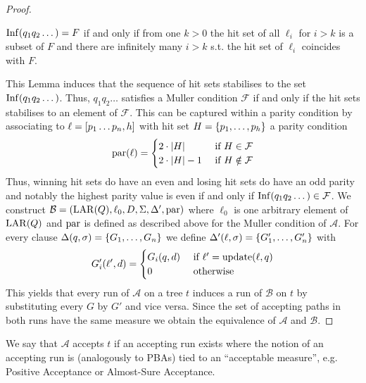 \begin{proof}
  \begin{lemma}
    \cite[Lemma 2.1]{SimAltTreeAuto}
    $\operatorname{Inf}(q_{1}q_{2}\dots) = F$ if and only if from one $k>0$ the hit set of
    all $\ell_{i}$ for $i>k$ is a subset of $F$ and there are infinitely many
    $i>k$ s.t. the hit set of $\ell_{i}$ coincides with $F$.
  \end{lemma}
  This Lemma induces that the sequence of hit sets stabilises to the set
  $\operatorname{Inf}(q_{1}q_{2}\dots)$. Thus, $q_{1}q_{2}\dots$ satisfies a Muller condition
  $\mathcal{F}$ if and only if the hit sets stabilises to an element of
  $\mathcal{F}$. This can be captured within a parity condition by associating
  to $\ell = \left[p_{1}\dots p_{n},h\right]$ with hit set
  $H = \left\{p_{1},\dots,p_{h}\right\}$ a parity condition
  \begin{equation*}
    \operatorname{par}(\ell) = \begin{cases}
      2\cdot\left\vert{H}\right\vert &\text{ if }H\in\mathcal{F}\\
      2\cdot\left\vert{H}\right\vert-1 &\text{ if }H\notin\mathcal{F}
    \end{cases}
  \end{equation*}
  Thus, winning hit sets do have an even and losing hit sets do have an odd
  parity and notably the highest parity value is even if and only if
  $\operatorname{Inf}(q_{1}q_{2}\dots)\in\mathcal{F}$.
  We construct
  $\mathcal{B}=\left(\operatorname{LAR}(Q),\ell_{0}, D, \Sigma, \Delta',\operatorname{par}\right)$ where
  $\ell_{0}$ is one arbitrary element of $\operatorname{LAR}(Q)$ and $\operatorname{par}$ is defined as
  described above for the Muller condition of $\mathcal{A}$. For every clause
  $\Delta(q,\sigma) = \left\{G_{1},\dots,G_{n}\right\}$ we define
  $\Delta'(\ell,\sigma) = \left\{G_{1}',\dots,G_{n}'\right\}$ with
  \begin{equation*}
    G_{i}'(\ell', d) = \begin{cases}
      G_{i}(q,d) &\text{ if }\ell' = \operatorname{update}(\ell,q)\\
      0          &\text{ otherwise}
    \end{cases}
  \end{equation*}
  This yields that every run of $\mathcal{A}$ on a tree $t$ induces a run of
  $\mathcal{B}$ on $t$ by substituting every $G$ by $G'$ and vice versa. Since
  the set of accepting paths in both runs have the same measure we obtain the
  equivalence of $\mathcal{A}$ and $\mathcal{B}$.
\end{proof}
We say that $\mathcal{A}$ accepts $t$ if an accepting run exists where the
notion of an accepting run is (analogously to \acp{PBA}) tied to an
\enquote{acceptable measure}, e.g. Positive Acceptance or Almost-Sure
Acceptance.

